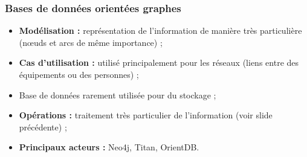 	\begin{frame}
		\frametitle{Bases de données orientées graphes}

		\begin{itemize}
			\item \textbf{Modélisation :} représentation de l'information de manière très particulière (nœuds et arcs de même importance) ;
			\item \textbf{Cas d'utilisation :} utilisé principalement pour les réseaux (liens entre des équipements ou des personnes) ;
			\item Base de données rarement utilisée pour du stockage ;
			\item \textbf{Opérations :} traitement très particulier de l'information (voir slide précédente) ;
			\item \textbf{Principaux acteurs :} Neo4j, Titan, OrientDB.
		\end{itemize}

	\end{frame}